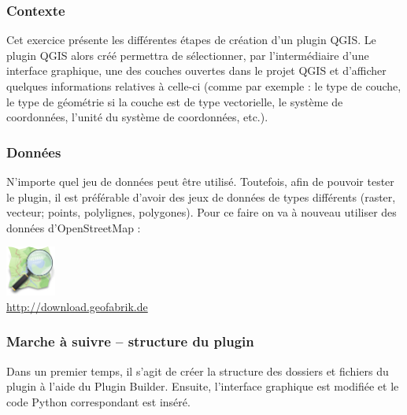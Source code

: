 \documentclass[11pt]{article}
\begin{document}
\subsubsection{Contexte}
Cet exercice présente les différentes étapes de création d'un plugin QGIS. Le plugin QGIS alors créé permettra de sélectionner, par l'intermédiaire d'une interface graphique, une des couches ouvertes dans le projet QGIS et d'afficher quelques informations relatives à celle-ci (comme par exemple : le type de couche, le type de géométrie si la couche est de type vectorielle, le système de coordonnées, l'unité du système de coordonnées, etc.). 


\subsubsection{Données}
N'importe quel jeu de données peut être utilisé. Toutefois, afin de pouvoir tester le plugin, il est préférable d'avoir des jeux de données de types différents (raster, vecteur; points, polylignes, polygones). 
Pour ce faire on va à nouveau utiliser des données d'OpenStreetMap : 
\begin{center}
\includegraphics[width=1.64cm]{osm.png}\\
\url{http://download.geofabrik.de} 
\end{center}
\vspace*{0.4em}





\newpage{}
\subsubsection{Marche à suivre \--- structure du plugin}
Dans un premier temps, il s'agit de créer la structure des dossiers et fichiers du plugin à l'aide du \og{}Plugin Builder\fg{}. Ensuite, l'interface graphique est modifiée et le code Python correspondant est inséré. 
\end{document}
